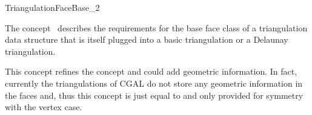 

\begin{ccRefConcept}{TriangulationFaceBase_2}


\ccDefinition
  
The concept \ccRefName\ describes the requirements for
the base face class of a triangulation data structure
that is itself plugged into a basic triangulation
or a Delaunay triangulation.

This concept refines the concept 
and could add  geometric information. In fact, 
currently the triangulations of
CGAL do not  store any geometric information in the faces
and, thus this concept is just equal to 
and only provided for symmetry with the vertex case.


\ccRefines
{}

\ccHasModels
{}


\ccSeeAlso
{} \\
 \\
 \\

\end{ccRefConcept}



